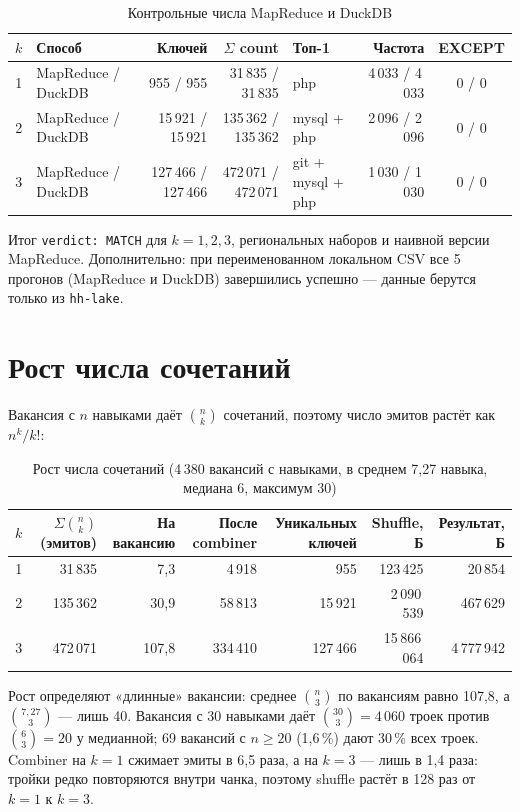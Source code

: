 \documentclass[11pt,a4paper]{article}
\newcommand{\code}[1]{\texttt{#1}}
\begin{document}
\begin{table}[H]
\centering
\small
\caption{Контрольные числа MapReduce и DuckDB}
\footnotesize
\begin{tabular}{@{}clrrlrc@{}}
\toprule
$k$ & Способ & Ключей & $\Sigma$ count & Топ-1 & Частота & EXCEPT \\
\midrule
1 & MapReduce / DuckDB & 955 / 955 & 31\,835 / 31\,835 & php & 4\,033 / 4\,033 & 0 / 0 \\
2 & MapReduce / DuckDB & 15\,921 / 15\,921 & 135\,362 / 135\,362 & mysql + php & 2\,096 / 2\,096 & 0 / 0 \\
3 & MapReduce / DuckDB & 127\,466 / 127\,466 & 472\,071 / 472\,071 & git + mysql + php & 1\,030 / 1\,030 & 0 / 0 \\
\bottomrule
\end{tabular}
\end{table}
Итог \code{verdict: MATCH} для $k=1,2,3$, региональных наборов и наивной версии MapReduce. Дополнительно: при переименованном локальном CSV все 5 прогонов (MapReduce и DuckDB) завершились успешно --- данные берутся только из \code{hh-lake}.

\section{Рост числа сочетаний}

Вакансия с $n$ навыками даёт $\binom{n}{k}$ сочетаний, поэтому число эмитов растёт как $n^k/k!$:
\begin{table}[H]
\centering
\small
\caption{Рост числа сочетаний (4\,380 вакансий с навыками, в среднем 7,27 навыка, медиана 6, максимум 30)}
\begin{tabular}{@{}crrrrrr@{}}
\toprule
$k$ & $\Sigma\binom{n}{k}$ (эмитов) & На вакансию & После combiner & Уникальных ключей & Shuffle, Б & Результат, Б \\
\midrule
1 & 31\,835 & 7,3 & 4\,918 & 955 & 123\,425 & 20\,854 \\
2 & 135\,362 & 30,9 & 58\,813 & 15\,921 & 2\,090\,539 & 467\,629 \\
3 & 472\,071 & 107,8 & 334\,410 & 127\,466 & 15\,866\,064 & 4\,777\,942 \\
\bottomrule
\end{tabular}
\end{table}

Рост определяют «длинные» вакансии: среднее $\binom{n}{3}$ по вакансиям равно 107,8, а $\binom{7{,}27}{3}$ --- лишь 40. Вакансия с 30 навыками даёт $\binom{30}{3}=4\,060$ троек против $\binom{6}{3}=20$ у медианной; 69 вакансий с $n\ge20$ (1,6\,\%) дают 30\,\% всех троек. Combiner на $k=1$ сжимает эмиты в 6,5 раза, а на $k=3$ --- лишь в 1,4 раза: тройки редко повторяются внутри чанка, поэтому shuffle растёт в 128 раз от $k=1$ к $k=3$.
\end{document}
